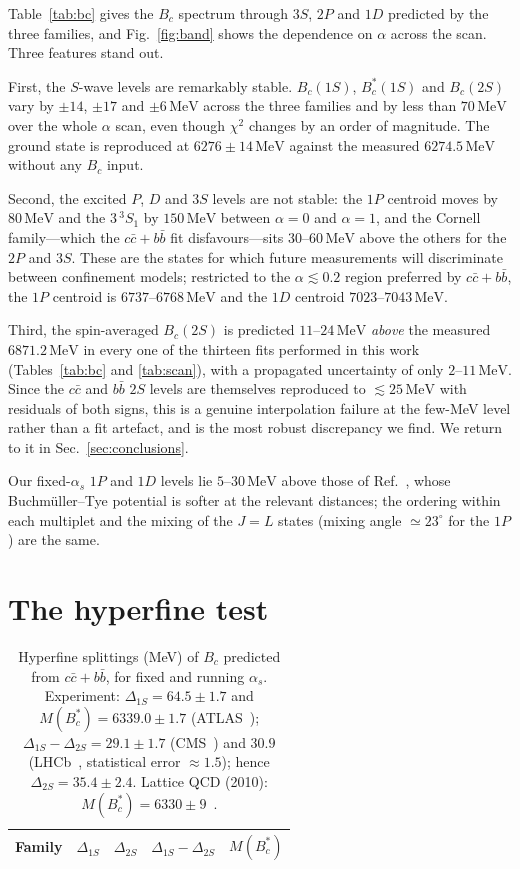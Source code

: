 \documentclass[10pt,twocolumn]{article}
\newcommand{\Bc}{B_c}
\newcommand{\Bcs}{B_c^*}
\newcommand{\cc}{c\bar c}
\newcommand{\bb}{b\bar b}
\newcommand{\MeV}{\,\mathrm{MeV}}
\begin{document}
Table~\ref{tab:bc} gives the $\Bc$ spectrum through $3S$, $2P$ and $1D$ predicted by the three families, and Fig.~\ref{fig:band} shows the dependence on $\alpha$ across the scan.
Three features stand out.

First, the $S$-wave levels are remarkably stable.
$\Bc(1S)$, $\Bcs(1S)$ and $\Bc(2S)$ vary by $\pm14$, $\pm17$ and $\pm6\MeV$ across the three families and by less than $70\MeV$ over the whole $\alpha$ scan, even though $\chi^2$ changes by an order of magnitude.
The ground state is reproduced at $6276\pm14\MeV$ against the measured $6274.5\MeV$ without any $\Bc$ input.

Second, the excited $P$, $D$ and $3S$ levels are not stable: the $1P$ centroid moves by $80\MeV$ and the $3\,^3S_1$ by $150\MeV$ between $\alpha=0$ and $\alpha=1$, and the Cornell family---which the $\cc+\bb$ fit disfavours---sits $30$--$60\MeV$ above the others for the $2P$ and $3S$.
These are the states for which future measurements will discriminate between confinement models; restricted to the $\alpha\lesssim0.2$ region preferred by $\cc+\bb$, the $1P$ centroid is $6737$--$6768\MeV$ and the $1D$ centroid $7023$--$7043\MeV$.

Third, the spin-averaged $\Bc(2S)$ is predicted $11$--$24\MeV$ \emph{above} the measured $6871.2\MeV$ in every one of the thirteen fits performed in this work (Tables~\ref{tab:bc} and \ref{tab:scan}), with a propagated uncertainty of only $2$--$11\MeV$.
Since the $\cc$ and $\bb$ $2S$ levels are themselves reproduced to $\lesssim25\MeV$ with residuals of both signs, this is a genuine interpolation failure at the few-MeV level rather than a fit artefact, and is the most robust discrepancy we find.
We return to it in Sec.~\ref{sec:conclusions}.

Our fixed-$\alpha_s$ $1P$ and $1D$ levels lie $5$--$30\MeV$ above those of Ref.~\cite{Eichten1994}, whose Buchm\"uller--Tye potential is softer at the relevant distances; the ordering within each multiplet and the mixing of the $J=L$ states (mixing angle $\simeq23^\circ$ for the $1P$) are the same.

\section{The hyperfine test}
\label{sec:hyperfine}

\begin{table}[t]
\caption{Hyperfine splittings (MeV) of $\Bc$ predicted from $\cc+\bb$, for fixed and running $\alpha_s$. Experiment: $\Delta_{1S}=64.5\pm1.7$ and $M(\Bcs)=6339.0\pm1.7$ (ATLAS~\cite{ATLAS2026}); $\Delta_{1S}-\Delta_{2S}=29.1\pm1.7$ (CMS~\cite{CMS2019}) and $30.9$ (LHCb~\cite{LHCb2019}, statistical error $\approx1.5$); hence $\Delta_{2S}=35.4\pm2.4$. Lattice QCD (2010): $M(\Bcs)=6330\pm9$~\cite{HPQCD2010}.}
\label{tab:hyp}
\centering\small
\begin{tabular}{lcccc}
\toprule
Family & $\Delta_{1S}$ & $\Delta_{2S}$ & $\Delta_{1S}-\Delta_{2S}$ & $M(\Bcs)$ \\
\midrule

\end{tabular}
\end{table}
\end{document}
